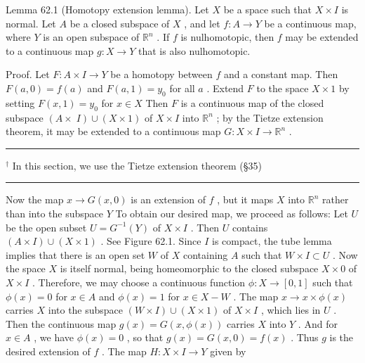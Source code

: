 \documentclass[10pt]{article}
\newcommand{\HRule}{\begin{center}\rule{0.9\linewidth}{0.2mm}\end{center}}
\begin{document}
Lemma 62.1 (Homotopy extension lemma). Let \(X\) be a space such that \(X \times  I\) is normal. Let \(A\) be a closed subspace of \(X\) , and let \(f : A \rightarrow  Y\) be a continuous map, where \(Y\) is an open subspace of \({\mathbb{R}}^{n}\) . If \(f\) is nulhomotopic, then \(f\) may be extended to a continuous map \(g : X \rightarrow  Y\) that is also nulhomotopic.

Proof. Let \(F : A \times  I \rightarrow  Y\) be a homotopy between \(f\) and a constant map. Then \(F\left( {a,0}\right)  = f\left( a\right)\) and \(F\left( {a,1}\right)  = {y}_{0}\) for all \(a\) . Extend \(F\) to the space \(X \times  1\) by setting \(F\left( {x,1}\right)  = {y}_{0}\) for \(x \in  X\) Then \(F\) is a continuous map of the closed subspace \((A \times \; I) \cup  \left( {X \times  1}\right)\) of \(X \times  I\) into \({\mathbb{R}}^{n}\) ; by the Tietze extension theorem, it may be extended to a continuous map \(G : X \times  I \rightarrow  {\mathbb{R}}^{n}\) .

\HRule

\({}^{ \dagger  }\) In this section, we use the Tietze extension theorem (§35)

\HRule

Now the map \(x \rightarrow  G\left( {x,0}\right)\) is an extension of \(f\) , but it maps \(X\) into \({\mathbb{R}}^{n}\) rather than into the subspace \(Y\) To obtain our desired map, we proceed as follows: Let \(U\) be the open subset \(U = {G}^{-1}\left( Y\right)\) of \(X \times  I\) . Then \(U\) contains \(\left( {A \times  I}\right)  \cup  \left( {X \times  1}\right)\) . See Figure 62.1. Since \(I\) is compact, the tube lemma implies that there is an open set \(W\) of \(X\) containing \(A\) such that \(W \times  I \subset  U\) . Now the space \(X\) is itself normal, being homeomorphic to the closed subspace \(X \times  0\) of \(X \times  I\) . Therefore, we may choose a continuous function \(\phi  : X \rightarrow  \left\lbrack  {0,1}\right\rbrack\) such that \(\phi \left( x\right)  = 0\) for \(x \in  A\) and \(\phi \left( x\right)  = 1\) for \(x \in  X - W\) . The map \(x \rightarrow  x \times  \phi \left( x\right)\) carries \(X\) into the subspace \(\left( {W \times  I}\right)  \cup  \left( {X \times  1}\right)\) of \(X \times  I\) , which lies in \(U\) . Then the continuous map \(g\left( x\right)  = G\left( {x,\phi \left( x\right) }\right)\) carries \(X\) into \(Y\) . And for \(x \in  A\) , we have \(\phi \left( x\right)  = 0\) , so that \(g\left( x\right)  = G\left( {x,0}\right)  = f\left( x\right)\) . Thus \(g\) is the desired extension of \(f\) . The map \(H : X \times  I \rightarrow  Y\) given by
\end{document}
